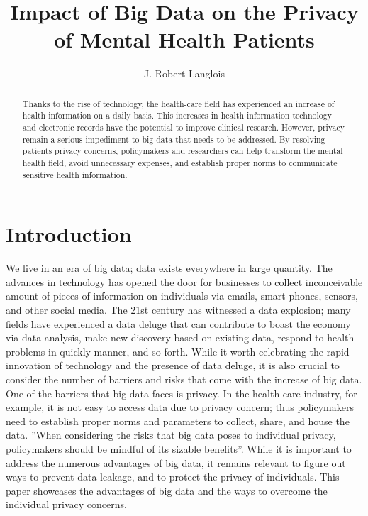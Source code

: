 \documentclass[sigconf]{acmart}
\begin{document}
\title{Impact of Big Data on the Privacy of Mental Health Patients}


\author{J. Robert Langlois}

\begin{abstract}
Thanks to the rise of technology, the health-care field has experienced an increase of health information on a daily basis. This increases in health information technology and electronic records have the potential to improve clinical research. However, privacy remain a serious impediment to big data that needs to be addressed. By resolving patients privacy concerns, policymakers and researchers can help transform the mental health field, avoid unnecessary expenses, and establish proper norms to communicate sensitive health information.    
\end{abstract}



\maketitle

\section{Introduction}

We live in an era of big data; data exists everywhere in large quantity. The advances in technology has opened the door for businesses to collect inconceivable amount of pieces of information on individuals via emails, smart-phones, sensors, and other social media. The 21st century has witnessed a data explosion; many fields have experienced a data deluge that can contribute to boast the economy via data analysis, make new discovery based on existing data, respond to health problems in quickly manner, and so forth. While it worth celebrating the rapid innovation of technology and the presence of data deluge, it is also crucial to consider the number of barriers and risks that come with the increase of big data. One of the barriers that big data faces is privacy. In the health-care industry, for example, it is not easy to access data due to privacy concern; thus policymakers need to establish proper norms and parameters to collect, share, and house the data. ''When considering the risks that big data poses to individual privacy, policymakers should be mindful of its sizable benefits''\cite{tene2012big}. While it is important to address the numerous advantages of big data, it remains relevant to figure out ways to prevent data leakage, and to protect the privacy of individuals. This paper showcases the advantages of big data and the ways to overcome the individual privacy concerns.    
\end{document}
